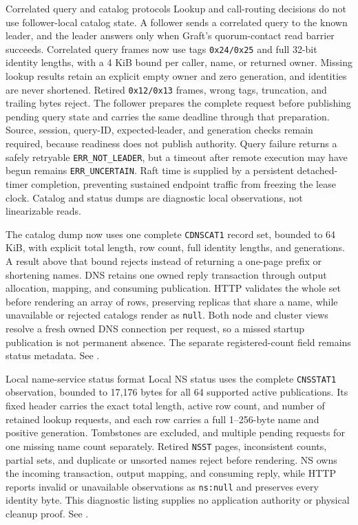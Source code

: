 \begin{implementationdetail}{Correlated query and catalog protocols}
Lookup and call-routing decisions do not use follower-local catalog state. A
follower sends a correlated query to the known leader, and the leader answers
only when Graft's quorum-contact read barrier succeeds. Correlated query frames
now use tags \texttt{0x24/0x25} and full 32-bit identity lengths, with a 4 KiB
bound per caller, name, or returned owner. Missing lookup results retain an
explicit empty owner and zero generation, and identities are never shortened.
Retired \texttt{0x12/0x13} frames, wrong tags, truncation, and trailing bytes
reject. The follower prepares the complete request before publishing pending
query state and carries the same deadline through that preparation. Source,
session, query-ID, expected-leader, and generation checks remain required, because
readiness does not publish authority. Query failure returns a
safely retryable \texttt{ERR\_NOT\_LEADER}, but a timeout after remote execution may
have begun remains \texttt{ERR\_UNCERTAIN}. Raft time is supplied by a persistent
detached-timer completion, preventing sustained endpoint traffic from freezing
the lease clock. Catalog and status dumps are diagnostic local observations,
not linearizable reads.

The catalog dump now uses one complete
\texttt{CDNSCAT1} record set, bounded to 64 KiB, with explicit total length,
row count, full identity lengths, and generations. A result above that bound
rejects instead of returning a one-page prefix or shortening names. DNS retains
one owned reply transaction through output allocation, mapping, and consuming
publication. HTTP validates the whole set before rendering an array of rows,
preserving replicas that share a name, while unavailable or rejected catalogs render
as \texttt{null}. Both node and cluster views resolve a fresh owned DNS connection
per request, so a missed startup publication is not permanent absence. The
separate registered-count field remains status metadata.
See .
\end{implementationdetail}

\begin{implementationdetail}{Local name-service status format}
Local NS status uses the complete \texttt{CNSSTAT1} observation, bounded to
17,176 bytes for all 64 supported active publications. Its fixed header carries
the exact total length, active row count, and number of retained lookup requests, and
each row carries a full 1--256-byte name and positive generation. Tombstones
are excluded, and multiple pending requests for one missing name count
separately. Retired \texttt{NSST} pages, inconsistent counts, partial sets, and
duplicate or unsorted names reject before rendering. NS owns the incoming
transaction, output mapping, and consuming reply, while HTTP reports invalid or
unavailable observations as \texttt{ns:null} and preserves every identity byte.
This diagnostic listing supplies no application authority or physical cleanup
proof. See .
\end{implementationdetail}

